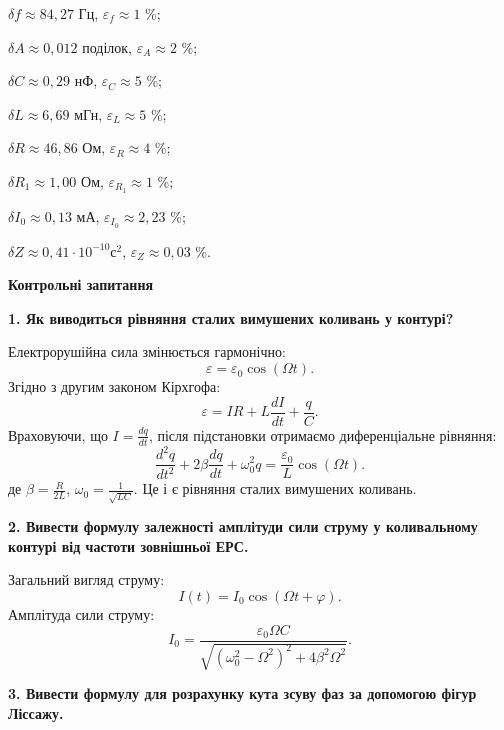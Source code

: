 \documentclass[12pt,a4paper]{article}
\begin{document}
    \vspace{1em}

    $\delta f \approx 84,27$ Гц, $\varepsilon_{f} \approx 1$ \%;

    $\delta A \approx 0,012$ поділок, $\varepsilon_{A} \approx 2$ \%;

    $\delta C \approx 0,29$ нФ, $\varepsilon_{C} \approx 5$ \%;

    $\delta L \approx 6,69$ мГн, $\varepsilon_{L} \approx 5$ \%;

    $\delta R \approx 46,86$ Ом, $\varepsilon_{R} \approx 4$ \%;

    $\delta R_1 \approx 1,00$ Ом, $\varepsilon_{R_1} \approx 1$ \%;

    $\delta I_0 \approx 0,13$ мА, $\varepsilon_{I_0} \approx 2,23$ \%;

    $\delta Z \approx 0,41 \cdot 10^{-10} \text{с}^2$, $\varepsilon_{Z} \approx 0,03$ \%.

    \newpage

    \begin{center}
        \textbf{\Large Контрольні запитання}
    \end{center}

    \textbf{1. Як виводиться рівняння сталих вимушених коливань у контурі?}

    Електрорушійна сила змінюється гармонічно:
    \[
    \varepsilon = \varepsilon_0 \cos(\Omega t).
    \]
    Згідно з другим законом Кірхгофа:
    \[
    \varepsilon = IR + L\frac{dI}{dt} + \frac{q}{C}.
    \]
    Враховуючи, що $\displaystyle I = \frac{dq}{dt}$, після підстановки отримаємо диференціальне рівняння:
    \[
    \frac{d^2q}{dt^2} + 2\beta \frac{dq}{dt} + \omega_0^2 q = \frac{\varepsilon_0}{L} \cos(\Omega t).
    \]
    де $\displaystyle \beta = \frac{R}{2L}$, $\displaystyle \omega_0 = \frac{1}{\sqrt{LC}}$. Це і є рівняння сталих вимушених коливань.

    \vspace{1em}

    \textbf{2. Вивести формулу залежності амплітуди сили струму у коливальному контурі від частоти зовнішньої ЕРС.}

    Загальний вигляд струму:
    \[
    I(t) = I_0 \cos(\Omega t + \varphi).
    \]
    Амплітуда сили струму:
    \[
    I_0 = \frac{\varepsilon_0 \Omega C}{\sqrt{(\omega_0^2 - \Omega^2)^2 + 4\beta^2 \Omega^2}}.
    \]

    \vspace{1em}

    \textbf{3. Вивести формулу для розрахунку кута зсуву фаз за допомогою фігур Ліссажу.}
\end{document}
